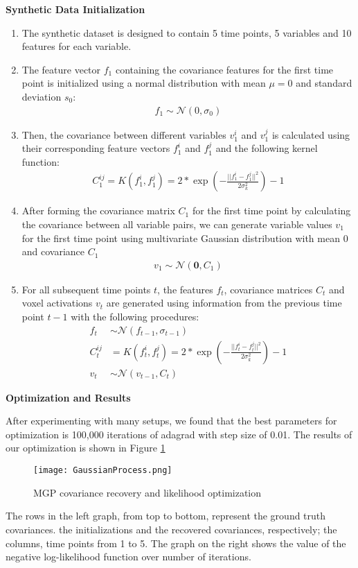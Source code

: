 \documentclass[12pt]{article}
\begin{document}
\textbf{Synthetic Data Initialization}
\begin{enumerate}
\item The synthetic dataset is designed to contain 5 time points, 5 variables and 10 features for each variable.
\item The feature vector \textbf{$f_1$ } containing the covariance features for the first time point is initialized using a normal distribution with mean $\mu = 0$ and standard deviation $s_0$:
\begin{align*}
f_1 \sim \mathcal{N}(0,\sigma_0)
\end{align*}
\item Then, the covariance between different variables $v^i_1$ and $v^j_1$ is calculated using their corresponding feature vectors $f_1^i$ and $f_1^j$ and the following kernel function:
\begin{align*}
C^{ij}_1=K(f_1^i,f_1^j)=2* \exp(-\frac{||f^i_1-f^j_1||^2}{2\sigma_k^2})-1
\end{align*}
\item After forming the covariance matrix $C_1$ for the first time point by calculating the covariance between all variable pairs, we can generate variable values $v_1$ for the first time point using multivariate Gaussian distribution with mean $0$ and covariance $C_1$
\begin{align*}
v_1 \sim \mathcal{N} (\textbf{0},C_1)
\end{align*}
\item For all subsequent time points $t$, the features $f_t$, covariance matrices $C_t$ and voxel activations $v_t$ are generated using information from the previous time point $t-1$ with the following procedures:
\begin{align*}
f_t &\sim \mathcal{N}(f_{t-1},\sigma_{t-1})\\
C^{ij}_t&=K(f_t^i,f_t^j)=2* \exp(-\frac{||f_t^i-f_t^j||^2}{2\sigma_k^2})-1\\
v_t &\sim \mathcal{N} (v_{t-1},C_t)
\end{align*}
\end{enumerate}

\textbf{Optimization and Results}\par
After experimenting with many setups, we found that the best parameters for optimization is 100,000 iterations of adagrad with step size of 0.01. The results of our optimization is shown in Figure \ref{fig:gaussian}\par
\begin{figure}[h]
\caption{MGP covariance recovery and likelihood optimization}
\centering
\texttt{[image: GaussianProcess.png]}
\label{fig:gaussian}
\end{figure}
The rows in the left graph, from top to bottom, represent the ground truth covariances. the initializations and the recovered covariances, respectively; the columns, time points from 1 to 5. The graph on the right shows the value of the negative log-likelihood function over number of iterations.\par
\end{document}
